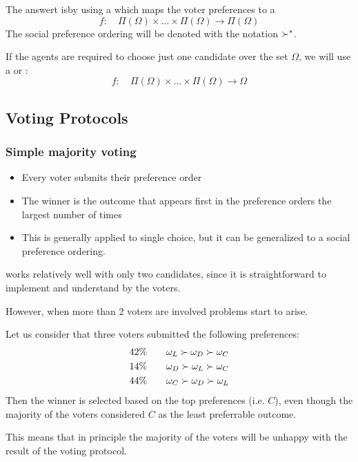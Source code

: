  The answert isby using a  which maps the voter preferences to a \\
 \[f:\quad \Pi(\Omega) \times ...\times\Pi(\Omega) \rightarrow \Pi(\Omega)\]
 The social preference ordering will be denoted with the notation $\succ^*$.
 
 If the agents are required to choose just one candidate over the set $\Omega$, we will use a  or :
 \[f:\quad \Pi(\Omega) \times ...\times\Pi(\Omega) \rightarrow \Omega\]

\subsection{Voting Protocols}
\subsubsection{Simple majority voting}
\begin{itemize}
\item Every voter submits their preference order
\item The winner is the outcome that appears first in the preference orders the largest number of times
\item This is generally applied to single choice, but it can be generalized to a social preference ordering.
\end{itemize}
\phantom{c} works relatively well with only two candidates, since it is straightforward to implement and understand by the voters.

However, when more than 2 voters are involved problems start to arise.

Let us consider that three voters submitted the following preferences:
\begin{align*}
42\%\qquad& \omega_L \succ \omega_D \succ \omega_C\\
14\%\qquad& \omega_D \succ \omega_L \succ \omega_C\\
44\%\qquad& \omega_C \succ \omega_D \succ \omega_L\\
\end{align*}
Then the winner is selected based on the top preferences (i.e. $C$), even though the majority of the voters considered $C$ as the least preferrable outcome.

This means that in principle the majority of the voters will be unhappy with the result of the voting protocol.

